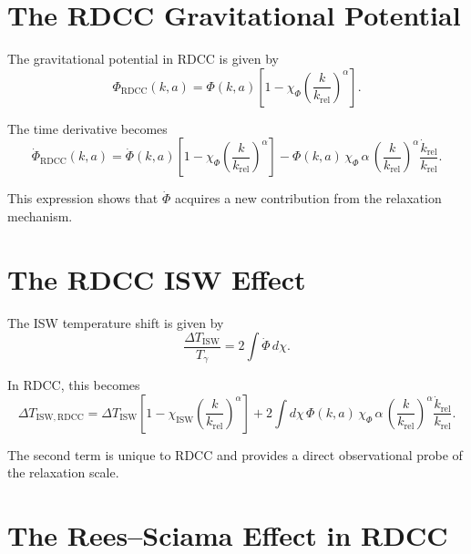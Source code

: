 \documentclass[11pt,a4paper]{article}
\begin{document}
\section{The RDCC Gravitational Potential}

The gravitational potential in RDCC is given by
\begin{equation}
    \Phi_{\mathrm{RDCC}}(k,a)
    = \Phi(k,a)
      \left[
        1 - \chi_{\Phi}
        \left(\frac{k}{k_{\mathrm{rel}}}\right)^{\alpha}
      \right].
\end{equation}

The time derivative becomes
\begin{equation}
    \dot{\Phi}_{\mathrm{RDCC}}(k,a)
    = \dot{\Phi}(k,a)
      \left[
        1 - \chi_{\Phi}
        \left(\frac{k}{k_{\mathrm{rel}}}\right)^{\alpha}
      \right]
      - \Phi(k,a)\,
        \chi_{\Phi}\,\alpha\,
        \left(\frac{k}{k_{\mathrm{rel}}}\right)^{\alpha}
        \frac{\dot{k}_{\mathrm{rel}}}{k_{\mathrm{rel}}}.
\end{equation}

This expression shows that $\dot{\Phi}$ acquires a new contribution from the 
relaxation mechanism.
\section{The RDCC ISW Effect}

The ISW temperature shift is given by
\begin{equation}
    \frac{\Delta T_{\mathrm{ISW}}}{T_{\gamma}}
    = 2 \int \dot{\Phi}\, d\chi.
\end{equation}

In RDCC, this becomes
\begin{equation}
    \Delta T_{\mathrm{ISW,RDCC}}
    = \Delta T_{\mathrm{ISW}}
      \left[
        1 - \chi_{\mathrm{ISW}}
        \left(\frac{k}{k_{\mathrm{rel}}}\right)^{\alpha}
      \right]
      + 2 \int d\chi\,
        \Phi(k,a)\,
        \chi_{\Phi}\,\alpha\,
        \left(\frac{k}{k_{\mathrm{rel}}}\right)^{\alpha}
        \frac{\dot{k}_{\mathrm{rel}}}{k_{\mathrm{rel}}}.
\end{equation}

The second term is unique to RDCC and provides a direct observational probe of the 
relaxation scale.
\section{The Rees--Sciama Effect in RDCC}
\end{document}

